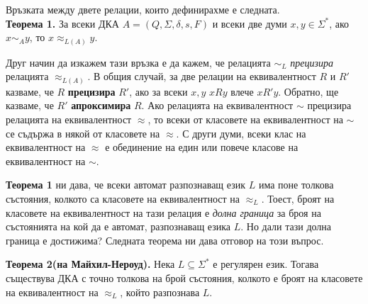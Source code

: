 \documentclass{article}
\begin{document}
    \vspace{15pt}

    \hspace{15pt} Връзката между двете релации, които дефинирахме е следната.\\
    \textbf{Теорема 1.} За всеки ДКА $A = (Q,\Sigma,\delta,s,F)$ и всеки две думи
    $x,y \in \Sigma^*$, ако $x \sim_A y$, то $x \approx_{L(A)} y$. \\
    
    \vspace{15pt}

    \hspace{15pt} Друг начин да изкажем тази връзка е да кажем, че релацията $\sim_L$ 
    \textit{прецизира} релацията $\approx_{L(A)}$. В общия случай, за две релации
    на еквивалентност $R$ и $R'$ казваме, че $R$ \textbf{прецизира} $R'$, ако за всеки
    $x,y$ $xRy$ влече $xR'y$. Обратно, ще казваме, че $R'$ \textbf{апроксимира} $R$.
    Ако релацията на еквивалентност $\sim$ прецизира релацията
    на еквивалентност $\approx$, то всеки от класовете на еквивалентност на $\sim$ се
    съдържа в някой от класовете на $\approx$. С други думи, всеки клас на еквивалентност
    на $\approx$ е обединение на един или повече класове на еквивалентност на $\sim$.

    \vspace{15pt}

    \hspace{15pt} \textbf{Теорема 1} ни дава, че всеки автомат разпознаващ език $L$ има
    поне толкова състояния, колкото са класовете на еквивалентност на $\approx_L$.
    Тоест, броят на класовете на еквивалентност на тази релация е \textit{долна граница}
    за броя на състоянията на кой да е автомат, разпознаващ езика $L$. Но дали тази
    долна граница е достижима? Следната теорема ни дава отговор на този въпрос. \\
    
    \vspace{15pt}

    \textbf{Теорема 2(на Майхил-Нероуд).} Нека $L \subseteq \Sigma^*$ е регулярен език.
    Тогава съществува ДКА с точно толкова на брой състояния, колкото е броят на 
    класовете на еквивалентност на $\approx_L$, който разпознава $L$.

    \vspace{15pt}
\end{document}
